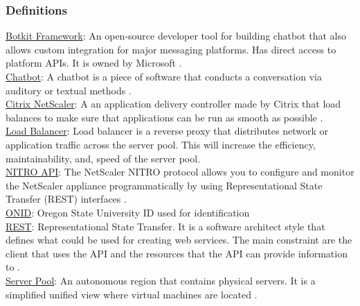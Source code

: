 \subsubsection{Definitions}
\underline{Botkit Framework}: An open-source developer tool for building chatbot that also allows custom integration for major messaging platforms. Has direct access to platform APIs. It is owned by Microsoft \cite{framework}.
\\\underline{Chatbot}: A chatbot is a piece of software that conducts a conversation via auditory or textual methods \cite{chatbot}.
\\\underline{Citrix NetScaler}: A an application delivery controller made by Citrix that load balances to make sure that applications can be run as smooth as possible \cite{netscaler}.
\\\underline{Load Balancer}: Load balancer is a reverse proxy that distributes network or application traffic across the server pool. This will increase the efficiency, maintainability, and, speed of the server pool. 
\\\underline{NITRO API}: The NetScaler NITRO protocol allows you to configure and monitor the NetScaler appliance programmatically by using Representational State Transfer (REST) interfaces \cite{citrixnitro}.
\\\underline{ONID}: Oregon State University ID used for identification
\\\underline{REST}: Representational State Transfer. It is a software architect style that defines what could be used for creating web services. The main constraint are the client that uses the API and the resources that the API can provide information to \cite{restphd} \cite{rest}.  
\\\underline{Server Pool}: An autonomous region that contains physical servers. It is a simplified unified view where virtual machines are located \cite{pools}.

